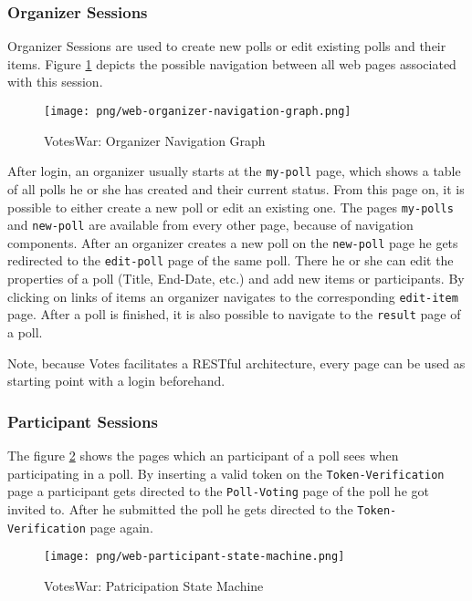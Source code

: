\subsubsection{Organizer Sessions}
Organizer Sessions are used to create new polls or edit existing polls and their items.
Figure \ref{figure:web-organizer-navigation-graph} depicts the possible navigation between all web pages associated with this session. 

\begin{figure}[h]
\centering
\texttt{[image: png/web-organizer-navigation-graph.png]}
\caption{VotesWar: Organizer Navigation Graph}
\label{figure:web-organizer-navigation-graph}
\end{figure}

After login, an organizer usually starts at the \texttt{my-poll} page, which shows a table of all polls he or she has created and their current status.
From this page on, it is possible to either create a new poll or edit an existing one.
The pages \texttt{my-polls} and \texttt{new-poll} are available from every other page, because of navigation components.
After an organizer creates a new poll on the \texttt{new-poll} page he gets redirected to the \texttt{edit-poll} page of the same poll.
There he or she can edit the properties of a poll (Title, End-Date, etc.) and add new items or participants. 
By clicking on links of items an organizer navigates to the corresponding \texttt{edit-item} page.
After a poll is finished, it is also possible to navigate to the \texttt{result} page of a poll.

Note, because Votes facilitates a RESTful architecture, every page can be used as starting point with a login beforehand.

\subsubsection{Participant Sessions}
The figure \ref{figure:web-participation-state-machine} shows the pages which an participant of a poll sees when participating in  a poll. By inserting a valid token on the \texttt{Token-Verification} page a participant gets directed to the \texttt{Poll-Voting} page of the poll he got invited to. After he submitted the poll he gets directed to the \texttt{Token-Verification} page again.
\begin{figure}[h]
\centering
\texttt{[image: png/web-participant-state-machine.png]}
\caption{VotesWar: Patricipation State Machine}
\label{figure:web-participation-state-machine}
\end{figure}




